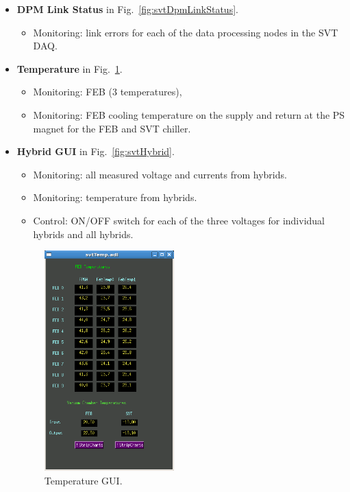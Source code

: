 \documentclass[12pt]{report}
\begin{document}
\begin{itemize}
\item \textbf{DPM  Link Status} in Fig.~\ref{fig:svtDpmLinkStatus}.
\begin{itemize}
\item Monitoring: link errors for each of the data processing nodes in the SVT DAQ.
\end{itemize}

\item \textbf{Temperature} in Fig.~\ref{fig:svtTemp}.
\begin{itemize}
\item Monitoring: FEB (3 temperatures), 
\item Monitoring: FEB cooling temperature on the supply and return at the PS magnet for the FEB and SVT chiller.
\end{itemize}

\item \textbf{Hybrid GUI} in Fig.~\ref{fig:svtHybrid}.
\begin{itemize}
\item Monitoring: all measured voltage and currents from hybrids. 
\item Monitoring: temperature from hybrids. 
\item Control: ON/OFF switch for each of the three voltages for individual hybrids and all hybrids.
\end{itemize}

\begin{figure}[ht!]
\centering
\includegraphics[width=5cm]{svtTemp.png}
\caption{Temperature GUI. \label{fig:svtTemp}}
\end{figure}


\end{itemize}
\end{document}
